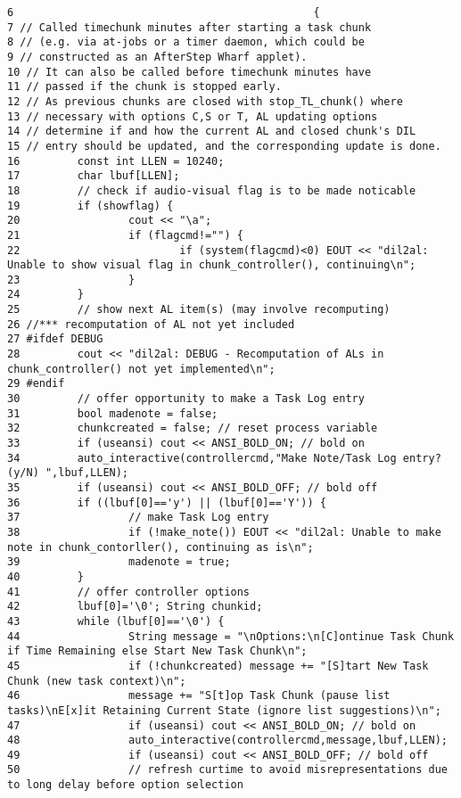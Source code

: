 \footnotesize\begin{verbatim}6                                               {
7 // Called timechunk minutes after starting a task chunk
8 // (e.g. via at-jobs or a timer daemon, which could be
9 // constructed as an AfterStep Wharf applet).
10 // It can also be called before timechunk minutes have
11 // passed if the chunk is stopped early.
12 // As previous chunks are closed with stop_TL_chunk() where
13 // necessary with options C,S or T, AL updating options
14 // determine if and how the current AL and closed chunk's DIL
15 // entry should be updated, and the corresponding update is done.
16         const int LLEN = 10240;
17         char lbuf[LLEN];
18         // check if audio-visual flag is to be made noticable
19         if (showflag) {
20                 cout << "\a";
21                 if (flagcmd!="") {
22                         if (system(flagcmd)<0) EOUT << "dil2al: Unable to show visual flag in chunk_controller(), continuing\n";
23                 }
24         }
25         // show next AL item(s) (may involve recomputing)
26 //*** recomputation of AL not yet included
27 #ifdef DEBUG
28         cout << "dil2al: DEBUG - Recomputation of ALs in chunk_controller() not yet implemented\n";
29 #endif
30         // offer opportunity to make a Task Log entry
31         bool madenote = false;
32         chunkcreated = false; // reset process variable
33         if (useansi) cout << ANSI_BOLD_ON; // bold on
34         auto_interactive(controllercmd,"Make Note/Task Log entry? (y/N) ",lbuf,LLEN);
35         if (useansi) cout << ANSI_BOLD_OFF; // bold off
36         if ((lbuf[0]=='y') || (lbuf[0]=='Y')) {
37                 // make Task Log entry
38                 if (!make_note()) EOUT << "dil2al: Unable to make note in chunk_contorller(), continuing as is\n";
39                 madenote = true;
40         }
41         // offer controller options
42         lbuf[0]='\0'; String chunkid;
43         while (lbuf[0]=='\0') {
44                 String message = "\nOptions:\n[C]ontinue Task Chunk if Time Remaining else Start New Task Chunk\n";
45                 if (!chunkcreated) message += "[S]tart New Task Chunk (new task context)\n";
46                 message += "S[t]op Task Chunk (pause list tasks)\nE[x]it Retaining Current State (ignore list suggestions)\n";
47                 if (useansi) cout << ANSI_BOLD_ON; // bold on
48                 auto_interactive(controllercmd,message,lbuf,LLEN);
49                 if (useansi) cout << ANSI_BOLD_OFF; // bold off
50                 // refresh curtime to avoid misrepresentations due to long delay before option selection

\end{verbatim}
